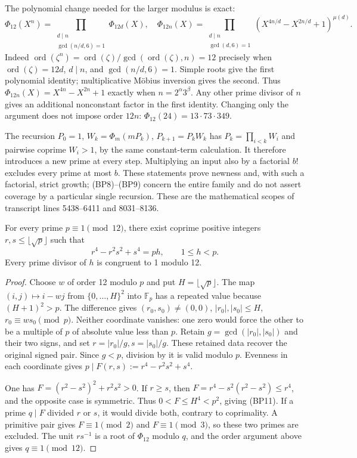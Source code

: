 The polynomial change needed for the larger modulus is exact:
\[
 \Phi_{12}(X^n)
 =\prod_{\substack{d\mid n\\\gcd(n/d,6)=1}}\Phi_{12d}(X),
 \quad
 \Phi_{12n}(X)=
 \prod_{\substack{d\mid n\\\gcd(d,6)=1}}
 (X^{4n/d}-X^{2n/d}+1)^{\mu(d)}.
 \tag{BP10}
\]
Indeed \(\operatorname{ord}(\zeta^n)=\operatorname{ord}(\zeta)/
\gcd(\operatorname{ord}(\zeta),n)=12\) precisely when
\(\operatorname{ord}(\zeta)=12d\), \(d\mid n\), and
\(\gcd(n/d,6)=1\). Simple roots give the first polynomial
identity; multiplicative M\"obius inversion gives the second.
Thus \(\Phi_{12n}(X)=X^{4n}-X^{2n}+1\) exactly when
\(n=2^\alpha3^\beta\). Any other prime divisor of \(n\)
gives an additional nonconstant factor in the first identity.
Changing only the argument does not impose order \(12n\):
\(\Phi_{12}(24)=13\cdot73\cdot349\).

The recursion \(P_0=1\), \(W_k=\Phi_m(mP_k)\),
\(P_{k+1}=P_kW_k\) has \(P_k=\prod_{i<k}W_i\) and pairwise
coprime \(W_i>1\), by the same constant-term calculation. It
therefore introduces a new prime at every step. Multiplying an input
also by a factorial \(b!\) excludes every prime at most \(b\).
These statements prove newness and, with such a factorial, strict
growth; (BP8)--(BP9) concern the entire family and do not assert
coverage by a particular single recursion. These are the mathematical
scopes of transcript lines 5438--6411 and 8031--8136.

\begin{theorem}
\label{thm:bp-short}
For every prime \(p\equiv1\pmod{12}\), there exist coprime
positive integers \(r,s\le\lfloor\sqrt p\rfloor\) such that
\[
 r^4-r^2s^2+s^4=ph,\qquad 1\le h<p.
 \tag{BP11}
\]
Every prime divisor of \(h\) is congruent to 1 modulo 12.
\end{theorem}
\begin{proof}
Choose \(w\) of order 12 modulo \(p\) and put
\(H=\lfloor\sqrt p\rfloor\). The map
\((i,j)\mapsto i-wj\) from \(\{0,\ldots,H\}^2\) into
\(\mathbb F_p\) has a repeated value because \((H+1)^2>p\).
The difference gives \((r_0,s_0)\ne(0,0)\),
\(|r_0|,|s_0|\le H\), \(r_0\equiv ws_0\pmod p\).
Neither coordinate vanishes: one zero would force the other to be
a multiple of \(p\) of absolute value less than \(p\).
Retain \(g=\gcd(|r_0|,|s_0|)\) and their two signs, and set
\(r=|r_0|/g,s=|s_0|/g\). These retained data recover the original
signed pair. Since \(g<p\), division by it is valid modulo \(p\).
Evenness in each coordinate gives
\(p\mid F(r,s):=r^4-r^2s^2+s^4\).

One has \(F=(r^2-s^2)^2+r^2s^2>0\). If \(r\ge s\),
then \(F=r^4-s^2(r^2-s^2)\le r^4\), and the opposite case is
symmetric. Thus \(0<F\le H^4<p^2\), giving (BP11).
If a prime \(q\mid F\) divided \(r\) or \(s\), it would
divide both, contrary to coprimality. A primitive pair gives
\(F\equiv1\pmod2\) and \(F\equiv1\pmod3\), so these two
primes are excluded. The unit \(rs^{-1}\) is a root of
\(\Phi_{12}\) modulo \(q\), and the order argument above gives
\(q\equiv1\pmod{12}\).
\end{proof}

